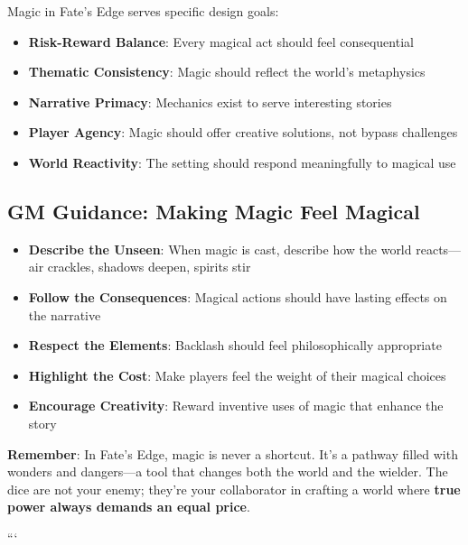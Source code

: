 Magic in Fate's Edge serves specific design goals:

\begin{itemize}
    \item \textbf{Risk-Reward Balance}: Every magical act should feel consequential
    \item \textbf{Thematic Consistency}: Magic should reflect the world's metaphysics
    \item \textbf{Narrative Primacy}: Mechanics exist to serve interesting stories
    \item \textbf{Player Agency}: Magic should offer creative solutions, not bypass challenges
    \item \textbf{World Reactivity}: The setting should respond meaningfully to magical use
\end{itemize}

\subsection*{GM Guidance: Making Magic Feel Magical}

\begin{itemize}
    \item \textbf{Describe the Unseen}: When magic is cast, describe how the world reacts—air crackles, shadows deepen, spirits stir
    \item \textbf{Follow the Consequences}: Magical actions should have lasting effects on the narrative
    \item \textbf{Respect the Elements}: Backlash should feel philosophically appropriate
    \item \textbf{Highlight the Cost}: Make players feel the weight of their magical choices
    \item \textbf{Encourage Creativity}: Reward inventive uses of magic that enhance the story
\end{itemize}

\textbf{Remember}: In Fate's Edge, magic is never a shortcut. It's a pathway filled with wonders and dangers—a tool that changes both the world and the wielder. The dice are not your enemy; they're your collaborator in crafting a world where \textbf{true power always demands an equal price}.


```
